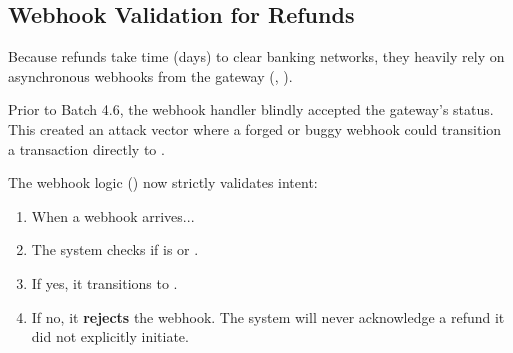 \subsection{Webhook Validation for Refunds}

Because refunds take time (days) to clear banking networks, they heavily rely on asynchronous webhooks from the gateway (, ).

Prior to Batch 4.6, the webhook handler blindly accepted the gateway's status. This created an attack vector where a forged or buggy webhook could transition a  transaction directly to . 

The webhook logic () now strictly validates intent:
\begin{enumerate}
    \item When a  webhook arrives...
    \item The system checks if  is  or .
    \item If yes, it transitions to .
    \item If no, it \textbf{rejects} the webhook. The system will never acknowledge a refund it did not explicitly initiate.
\end{enumerate}
